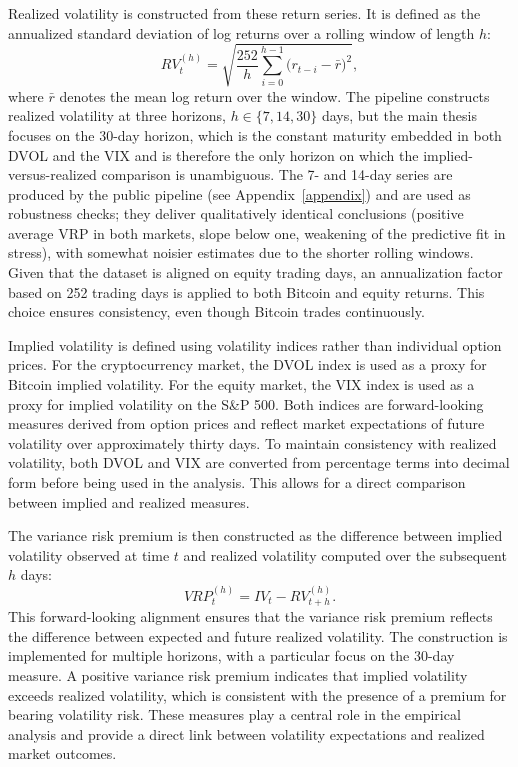 \documentclass[11pt,a4paper,openany]{report}
\begin{document}
Realized volatility is constructed from these return series. It is
defined as the annualized standard deviation of log returns over a rolling
window of length $h$:
\begin{equation}
RV_t^{(h)} = \sqrt{\frac{252}{h}\sum_{i=0}^{h-1}\bigl(r_{t-i}-\bar{r}\bigr)^{2}},
\label{eq:rv}
\end{equation}
where $\bar{r}$ denotes the mean log return over the window. The
pipeline constructs realized volatility at three horizons,
$h \in \{7, 14, 30\}$ days, but the main thesis focuses on the 30-day
horizon, which is the constant maturity embedded in both DVOL and the
VIX and is therefore the only horizon on which the implied-versus-realized
comparison is unambiguous. The 7- and 14-day series are produced by the
public pipeline (see Appendix~\ref{appendix}) and are used as
robustness checks; they deliver qualitatively identical conclusions
(positive average VRP in both markets, slope below one, weakening of
the predictive fit in stress), with somewhat noisier estimates due to
the shorter rolling windows. Given that the dataset is aligned on equity
trading days, an annualization factor based on 252 trading days is
applied to both Bitcoin and equity returns. This choice ensures
consistency, even though Bitcoin trades continuously.

Implied volatility is defined using volatility indices rather than
individual option prices. For the cryptocurrency market, the DVOL index
is used as a proxy for Bitcoin implied volatility. For the equity
market, the VIX index is used as a proxy for implied volatility on the
S\&P 500. Both indices are forward-looking measures derived from option
prices and reflect market expectations of future volatility over
approximately thirty days. To maintain consistency with realized
volatility, both DVOL and VIX are converted from percentage terms into
decimal form before being used in the analysis. This allows for a direct
comparison between implied and realized measures.

The variance risk premium is then constructed as the difference between
implied volatility observed at time $t$ and realized volatility computed
over the subsequent $h$ days:
\begin{equation}
VRP_t^{(h)} = IV_t - RV_{t+h}^{(h)}.
\label{eq:vrp}
\end{equation}
This forward-looking alignment ensures that the variance risk premium
reflects the difference between expected and future realized volatility.
The construction is implemented for multiple horizons, with a particular
focus on the 30-day measure. A positive variance risk premium indicates
that implied volatility exceeds realized volatility, which is consistent
with the presence of a premium for bearing volatility risk. These
measures play a central role in the empirical analysis and provide a
direct link between volatility expectations and realized market
outcomes.
\end{document}
